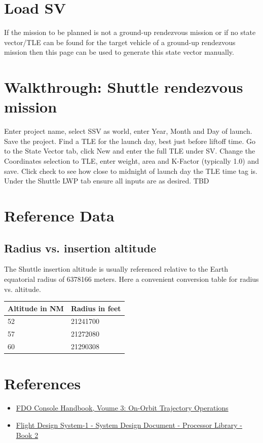 \documentclass[11pt]{article} %
\begin{document}
\section{Load SV}
If the mission to be planned is not a ground-up rendezvous mission or if no state vector/TLE can be found for the target vehicle of a ground-up rendezvous mission then this page can be used to generate this state vector manually.\\
\newpage
\section{Walkthrough: Shuttle rendezvous mission}
Enter project name, select SSV as world, enter Year, Month and Day of launch. Save the project. Find a TLE for the launch day, best just before liftoff time. Go to the State Vector tab, click New and enter the full TLE under SV. Change the Coordinates selection to TLE, enter weight, area and K-Factor (typically 1.0) and save. Click check to see how close to midnight of launch day the TLE time tag is.\\

Under the Shuttle LWP tab ensure all inputs are as desired. TBD\\
\newpage
\section{Reference Data}
\subsection{Radius vs. insertion altitude}

The Shuttle insertion altitude is usually referenced relative to the Earth equatorial radius of 6378166 meters. Here a convenient conversion table for radius vs. altitude.\\

\begin{tabular}{ |l|l| }
\hline
Altitude in NM & Radius in feet\\
\hline
52 & 21241700 \\
57 & 21272080 \\
60 & 21290308 \\
\hline
\end{tabular}
\newpage
\section{References}
\begin{itemize}
\item \href{https://www.ibiblio.org/apollo/Shuttle/MCC/FDO%20Console%20Handbook%20-%20On-orbit.pdf}{FDO Console Handbook, Voume 3: On-Orbit Trajectory Operations}
\item \href{https://web.archive.org/web/20100520004146/http://ntrs.nasa.gov/archive/nasa/casi.ntrs.nasa.gov/19800070628_1980070628.pdf}{Flight Design System-1 - System Design Document - Processor Library - Book 2}
\end{itemize}
\end{document}
